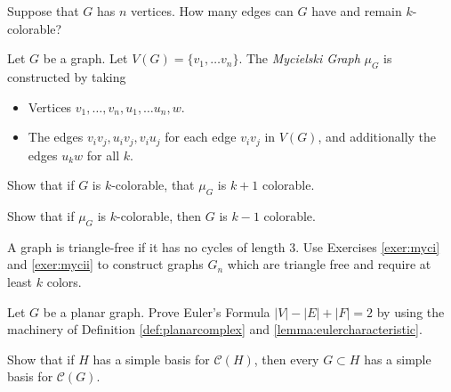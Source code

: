 \begin{exercise}
Suppose that $G$ has $n$ vertices. How many edges can $G$ have and remain $k$-colorable?
\label{exer:maximaledges}
\end{exercise}


Let $G$ be a graph. Let $V(G)=\{v_1, \ldots v_n\}.$ The \emph{Mycielski Graph} $\mu_G$ is constructed by taking 
\begin{itemize}
\item Vertices $v_1, \ldots, v_n, u_1, \ldots u_n, w$. 
\item The edges $v_iv_j, u_iv_j, v_iu_j$ for each edge $v_iv_j$ in $V(G)$, and additionally the edges $u_kw$ for all $k$. 
\end{itemize}

\begin{exercise}[Mycielski I]
Show that if $G$ is $k$-colorable, that $\mu_G$ is $k+1$ colorable. \label{exer:myci}
\end{exercise}

\begin{exercise}[Mycielski II]
Show that if $\mu_G$ is $k$-colorable, then $G$ is $k-1$ colorable.  \label{exer:mycii}
\end{exercise}

\begin{exercise}
A graph is triangle-free if it has no cycles of length 3. Use Exercises \ref{exer:myci} and \ref{exer:mycii} to construct graphs $G_n$ which are triangle free and require at least $k$ colors.  \label{exer:myciii}
\end{exercise}

\begin{exercise}
Let $G$ be a planar graph. Prove Euler's Formula $|V|-|E|+|F|=2$ by using the machinery of Definition \ref{def:planarcomplex} and \ref{lemma:eulercharacteristic}.
\label{exer:eulercharacteristic}
\end{exercise}


\begin{exercise}
Show that if $H$ has a simple basis for $\mathcal C(H)$, then every $G\subset H$ has a simple basis for $\mathcal C(G)$.  \label{exer:simplebasis} 
\end{exercise}
